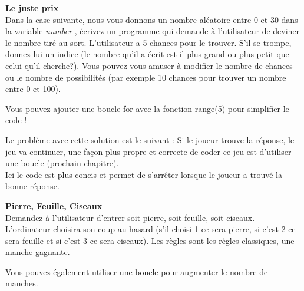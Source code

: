 \begin{Exercice}[20 minutes] \textbf{Le juste prix}\\
  Dans la case suivante, nous vous donnons un nombre aléatoire entre 0 et 30 dans la variable \textit{number} , écrivez un programme qui demande à l'utilisateur de deviner le nombre tiré au sort. L'utilisateur a 5 chances pour le trouver. S'il se trompe, donnez-lui un indice (le nombre qu'il a écrit est-il plus grand ou plus petit que celui qu'il cherche?). Vous pouvez vous amuser à modifier le nombre de chances ou le nombre de possibilités (par exemple 10 chances pour trouver un nombre entre 0 et 100).   \\
  
  
  
  
   
    \begin{conseil}
      	Vous pouvez ajouter une boucle for avec la fonction range(5) pour simplifier le code !
        
    \end{conseil}
    \begin{solution}
    
   
   
   Le problème avec cette solution est le suivant : Si le joueur trouve la réponse, le jeu va continuer, une façon plus propre et correcte de coder ce jeu est d'utiliser une boucle (prochain chapitre). \\
   
   
   
  	Ici le code est plus concis et permet de s'arrêter lorsque le joueur a trouvé la bonne réponse.\\
           
    \end{solution}   
\end{Exercice}

\newpage
\begin{Exercice}[20 minutes] \textbf{Pierre, Feuille, Ciseaux}\\
  Demandez à l'utilisateur d'entrer soit pierre, soit feuille, soit ciseaux. L'ordinateur choisira son coup au hasard (s'il choisi 1 ce sera pierre, si c'est 2 ce sera feuille et si c'est 3 ce sera ciseaux). Les règles sont les règles classiques, une manche gagnante.   \\
  
  
   
    \begin{solution}
    
    
    
    Vous pouvez également utiliser une boucle pour augmenter le nombre de manches. \\
           
    \end{solution}   
\end{Exercice}



